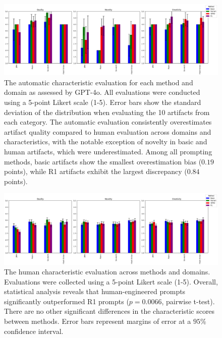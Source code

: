 \documentclass[phd,electronic,oneside,twosidetoc,letterpaper,chaptercenter,parttop,lof]{byumsphd}
\begin{document}
\begin{figure}[t]
    \centering
    \includegraphics[width=\linewidth]{images/cc_prompting/automatic_evaluation_scores.png}
    \caption[Automatic characteristic evaluation]{The automatic characteristic evaluation for each method and domain as assessed by GPT-4o. All evaluations were conducted using a 5-point Likert scale (1-5). Error bars show the standard deviation of the distribution when evaluating the 10 artifacts from each category. The automatic evaluation consistently overestimates artifact quality compared to human evaluation across domains and characteristics, with the notable exception of novelty in basic and human artifacts, which were underestimated. Among all prompting methods, basic artifacts show the smallest overestimation bias ($0.19$ points), while R1 artifacts exhibit the largest discrepancy ($0.84$ points).
}
    \label{fig:auto_eval}\vspace{-.1in}
\end{figure}

\begin{figure}[t!]
    \centering
    \includegraphics[width=\textwidth]{images/cc_prompting/human_evaluation_scores.png}
    \caption[Human characteristic evaluation]{The human characteristic evaluation across methods and domains. Evaluations were collected using a 5-point Likert scale (1-5). Overall, statistical analysis reveals that human-engineered prompts significantly outperformed R1 prompts ($p = 0.0066$, pairwise t-test). There are no other significant differences in the characteristic scores between methods. Error bars represent margins of error at a $95$\% confidence interval.
}
    \label{fig:human_eval}
\end{figure}
\end{document}
